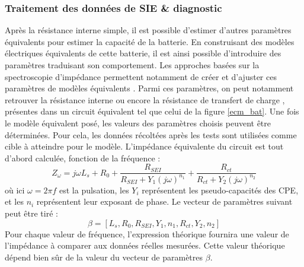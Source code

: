 \subsubsection{Traitement des données de SIE \& diagnostic}
\label{sec:diag_sie}
Après la résistance interne simple, il est possible d'estimer d'autres paramètres équivalents pour estimer la capacité de la batterie. En construisant des modèles électriques équivalents de cette batterie, il est ainsi possible d'introduire des paramètres traduisant son comportement. Les approches basées sur la spectroscopie d'impédance permettent notamment de créer et d'ajuster ces paramètres de modèles équivalents \cite{liu_state--health_2023}. Parmi ces paramètres, on peut notamment retrouver la résistance interne ou encore la résistance de transfert de charge \cite{zhang_electrochemical_2022}\cite{nguyen_van_estimation_2023}, présentes dans un circuit équivalent tel que celui de la figure \ref{ecm_bat}.
Une fois le modèle équivalent posé, les valeurs des paramètres choisis peuvent être déterminées. Pour cela, les données récoltées après les tests sont utilisées comme cible à atteindre pour le modèle. L'impédance équivalente du circuit est tout d'abord calculée, fonction de la fréquence : 
\begin{equation}
    Z_{\omega} = j\omega L_s + R_0 + \frac{R_{SEI}}{R_{SEI} + Y_1 (j\omega)^{n_1}} + \frac{R_{ct}}{R_{ct} + Y_2 (j\omega)^{n_2}}
\end{equation}
où ici $\omega = 2\pi f$ est la pulsation, les $Y_i$ représentent les pseudo-capacités des CPE, et les $n_i$ représentent leur exposant de phase. Le vecteur de paramètres suivant peut être tiré :
\begin{equation}
    \beta = \left[ L_s, R_0, R_{SEI}, Y_1, n_1, R_{ct}, Y_2, n_2 \right]
\end{equation}
Pour chaque valeur de fréquence, l'expression théorique fournira une valeur de l'impédance à comparer aux données réelles mesurées. Cette valeur théorique dépend bien sûr de la valeur du vecteur de paramètres $\beta$. 

